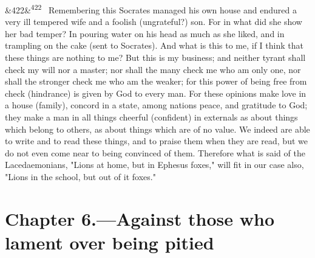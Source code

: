 \documentclass[12pt]{article}
\newcommand{\para}[1][]{\par\noindent\ifx&#1&\else\textsuperscript{\footnotesize #1}~\fi}
\begin{document}
\para[422] Remembering this Socrates managed his own house and endured a very ill tempered wife and a foolish (ungrateful?) son. For in what did she show her bad temper? In pouring water on his head as much as she liked, and in trampling on the cake (sent to Socrates). And what is this to me, if I think that these things are nothing to me? But this is my business; and neither tyrant shall check my will nor a master; nor shall the many check me who am only one, nor shall the stronger check me who am the weaker; for this power of being free from check (hindrance) is given by God to every man. For these opinions make love in a house (family), concord in a state, among nations peace, and gratitude to God; they make a man in all things cheerful (confident) in externals as about things which belong to others, as about things which are of no value. We indeed are able to write and to read these things, and to praise them when they are read, but we do not even come near to being convinced of them. Therefore what is said of the Lacedaemonians, "Lions at home, but in Ephesus foxes," will fit in our case also, "Lions in the school, but out of it foxes."

\section*{Chapter 6.---Against those who lament over being pitied}
\end{document}
